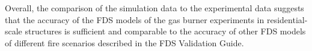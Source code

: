 Overall, the comparison of the simulation data to the experimental data suggests that the accuracy of the FDS models of the gas burner experiments in residential-scale structures is sufficient and comparable to the accuracy of other FDS models of different fire scenarios described in the FDS Validation Guide.
